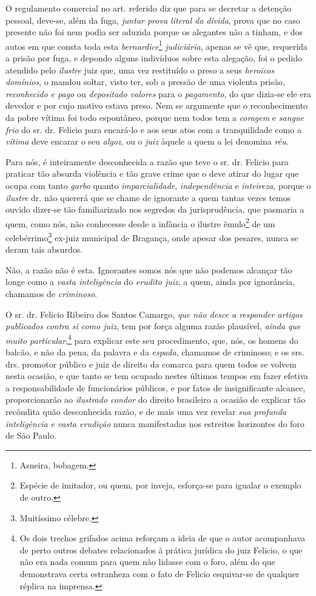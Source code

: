 O regulamento comercial no art. referido diz que para se decretar a
detenção pessoal, deve-se, além da fuga, \emph{juntar prova literal da
dívida}, prova que no caso presente não foi nem podia ser aduzida porque
os alegantes não a tinham, e dos autos em que consta toda esta
\emph{bernardice}\footnote{ Asneira, bobagem.} \emph{judiciária},
apenas se vê que, requerida a prisão por fuga, e depondo alguns
indivíduos sobre esta alegação, foi o pedido atendido pelo
\emph{ilustre} juiz que, uma vez restituído o preso a seus
\emph{heroicos domínios}, o mandou soltar, visto ter, sob a pressão de
uma violenta prisão, \emph{reconhecido e pago} ou \emph{depositado
valores} para o \emph{pagamento}, do que dizia-se ele era devedor e por
cujo motivo estava preso. Nem se argumente que o reconhecimento da pobre
vítima foi todo espontâneo, porque nem todos tem a \emph{coragem} e
\emph{sangue frio} do sr. dr. Felicio para encará-lo e aos seus atos com
a tranquilidade como a \emph{vítima} deve encarar o seu \emph{algoz}, ou
o \emph{juiz} àquele a quem a lei denomina \emph{réu}.

Para nós, é inteiramente desconhecida a razão que teve o sr. dr. Felicio
para praticar tão absurda violência e tão grave crime que o deve atirar
do lugar que ocupa com tanto \emph{garbo} quanto \emph{imparcialidade},
\emph{independência} e \emph{inteireza}, porque o \emph{ilustre} dr. não
quererá que se chame de ignorante a quem tantas vezes temos ouvido
dizer-se tão familiarizado nos segredos da jurisprudência, que pasmaria
a quem, como nós, não conhecesse desde a infância o ilustre
êmulo\footnote{ Espécie de imitador, ou quem, por inveja, esforça-se
  para igualar o exemplo de outro.} de um celebérrimo\footnote{
  Muitíssimo célebre.} ex-juiz municipal de Bragança, onde apesar dos
pesares, nunca se deram tais absurdos.

Não, a razão não é esta. Ignorantes somos nós que não podemos alcançar
tão longe como a \emph{vasta inteligência} do \emph{erudito juiz}, a
quem, ainda por ignorância, chamamos de \emph{criminoso}.

O sr. dr. Felicio Ribeiro dos Santos Camargo, \emph{que não desce a
responder artigos publicados contra si como juiz}, tem por força alguma
razão plausível, \emph{ainda que muito particular},\footnote{ Os dois
  trechos grifados acima reforçam a ideia de que o autor acompanhava de
  perto outros debates relacionados à prática jurídica do juiz Felicio,
  o que não era nada comum para quem não lidasse com o foro, além do que
  demonstrava certa estranheza com o fato de Felicio esquivar-se de
  qualquer réplica na imprensa.} para explicar este seu procedimento,
que, nós, os homens do balcão, e não da pena, da palavra e da
\emph{espada}, chamamos de criminoso; e os srs. drs. promotor público e
juiz de direito da comarca para quem todos se volvem nesta ocasião, e
que tanto se tem ocupado nestes últimos tempos em fazer efetiva a
responsabilidade de funcionários públicos, e por fatos de insignificante
alcance, proporcionarão ao \emph{ilustrado condor} do direito brasileiro
a ocasião de explicar tão recôndita quão desconhecida razão, e de mais
uma vez revelar \emph{sua profunda inteligência} \emph{e vasta erudição}
nunca manifestadas nos estreitos horizontes do foro de São Paulo.

